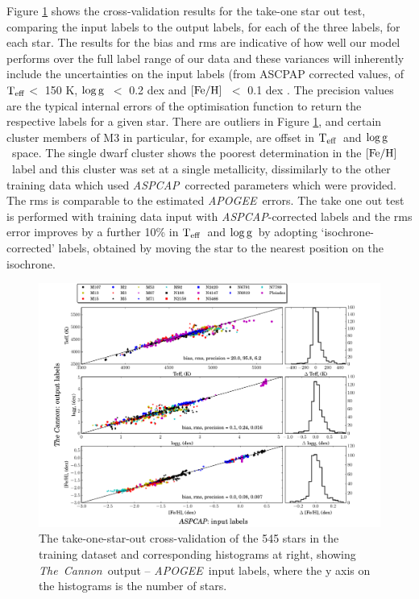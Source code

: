\documentclass[12pt, preprint]{aastex}
\newcommand{\teff}{\mbox{$\rm T_{eff}$}}
\newcommand{\feh}{\mbox{$\rm [Fe/H]$}}
\newcommand{\logg}{\mbox{$\rm \log g$}}
\newcommand{\tc}{\textsl{The~Cannon}}
\newcommand{\apogee}{\textsl{APOGEE}}
\newcommand{\aspcap}{\textsl{ASPCAP}}
\begin{document}
Figure \ref{fig:takeonestarout} shows the cross-validation results for the take-one star out test, comparing the input labels to the output labels, for each of the three labels, for each star. 
The results for the bias and rms are indicative of how well our model performs over the full label range of our data and these variances will inherently include the uncertainties on the input labels (from ASCPAP corrected values, of \teff $<$ 150 K, \logg\ $<$ 0.2 dex and \feh\ $<$ 0.1 dex \citep{Meszaros2013}. 
The precision values are the typical internal errors of the optimisation function to return the respective labels for a given star. 
There are outliers in Figure \ref{fig:takeonestarout}, and certain cluster members of M3 in particular, for example,  are offset in \teff\ and \logg\ space. 
The single dwarf cluster shows the poorest determination in the \feh\ label and this cluster was set at a single metallicity, dissimilarly to the other training data which used \aspcap\ corrected parameters which were provided. 
The rms is comparable to the estimated \apogee\ errors. The take one out test is performed with training data input with \aspcap-corrected labels and the rms error improves by a further 10\% in \teff\ and \logg\  by adopting `isochrone-corrected' labels, obtained by moving the star to the nearest position on the isochrone. 

\begin{figure}[h!]
\centering
    \includegraphics[scale=0.45]{./plots/takeout_hist.pdf}
\caption{The take-one-star-out cross-validation of the 545 stars in the training dataset and corresponding histograms at right, showing \tc\ output -- \apogee\ input labels, where the y axis on the histograms is the number of stars.}
\label{fig:takeonestarout}
\end{figure}
\end{document}
